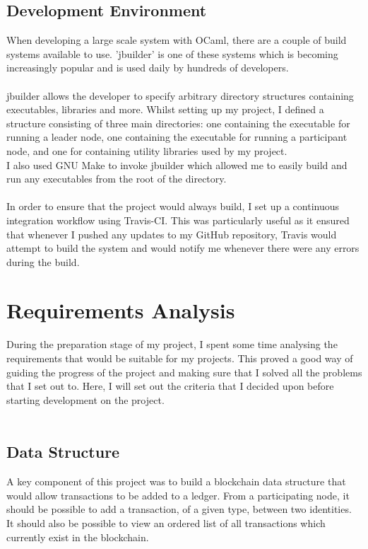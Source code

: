 \documentclass[12pt,a4paper,twoside,openright]{report}
\begin{document}
		\subsection*{Development Environment}
		When developing a large scale system with OCaml, there are a couple of build systems available to use. 'jbuilder' \cite{jbuilder} is one of these systems which is becoming increasingly popular and is used daily by hundreds of developers.\\
		\\
		jbuilder allows the developer to specify arbitrary directory structures containing executables, libraries and more. Whilst setting up my project, I defined a structure consisting of three main directories: one containing the executable for running a leader node, one containing the executable for running a participant node, and one for containing utility libraries used by my project.\\
		I also used GNU Make \cite{GNUMake} to invoke jbuilder which allowed me to easily build and run any executables from the root of the directory.\\
		\\
		In order to ensure that the project would always build, I set up a continuous integration workflow using Travis-CI. 
		This was particularly useful as it ensured that whenever I pushed any updates to my GitHub repository, Travis would attempt to build the system and would notify me whenever there were any errors during the build.
	\section{Requirements Analysis}
	During the preparation stage of my project, I spent some time analysing the requirements that would be suitable for my projects. This proved a good way of guiding the progress of the project and making sure that I solved all the problems that I set out to. Here, I will set out the criteria that I decided upon before starting development on the project.\\
	\\
	\subsection*{Data Structure}
	A key component of this project was to build a blockchain data structure that would allow transactions to be added to a ledger. 
	From a participating node, it should be possible to add a transaction, of a given type, between two identities. 
	It should also be possible to view an ordered list of all transactions which currently exist in the blockchain.
\end{document}
